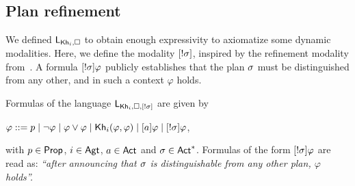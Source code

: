 \subsection{Plan refinement}
\label{sec:planref}

We defined $\mathsf{L}_{{\sf Kh}_i,\square}$ to obtain enough expressivity to axiomatize some dynamic modalities. Here, we define the modality $[!\sigma]$, inspired by the refinement modality from~. A formula $[!\sigma]\varphi$ publicly establishes that the plan $\sigma$ must be distinguished from any other, and in such a context $\varphi$ holds. 


\medskip 

\begin{definition}\label{def:srefsyntax}
Formulas of the language $\mathsf{L}_{{\sf Kh}_i,\square,[!\sigma]}$ are given by
\begin{spcenter}
$\varphi ::= p \mid \neg\varphi \mid \varphi\vee\varphi \mid {\sf Kh}_i(\varphi,\varphi) \mid [a]\varphi \mid [!\sigma]\varphi$,
\end{spcenter}
with $p \in {\rm \sf Prop}$, $i\in{\rm \sf Agt}$, $a \in {\rm \sf Act}$ and $\sigma \in {\rm \sf Act}^*$.  Formulas of the form $[!\sigma]\varphi$ are read as: \emph{``after announcing that $\sigma$ is distinguishable from any other plan, $\varphi$ holds''.} 
\end{definition}

\medskip 

